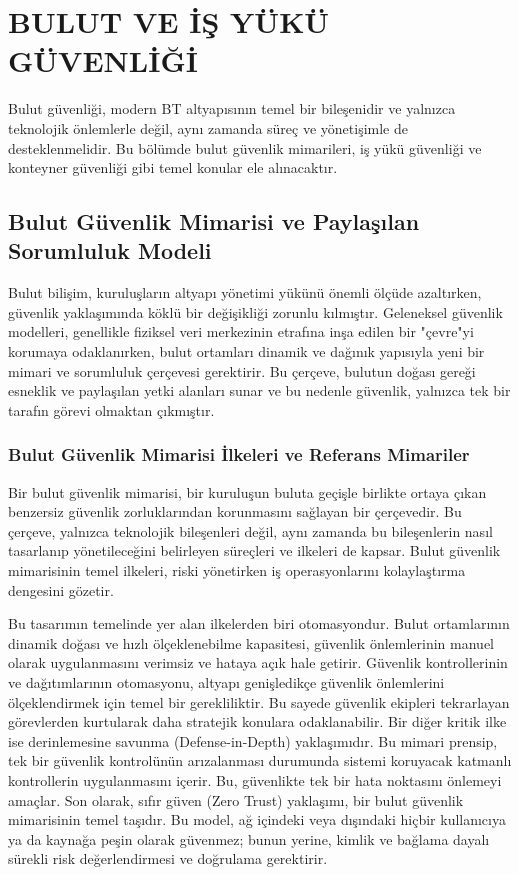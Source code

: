 \chapter{BULUT VE İŞ YÜKÜ GÜVENLİĞİ}

Bulut güvenliği, modern BT altyapısının temel bir bileşenidir ve yalnızca teknolojik önlemlerle değil, aynı zamanda süreç ve yönetişimle de desteklenmelidir. Bu bölümde bulut güvenlik mimarileri, iş yükü güvenliği ve konteyner güvenliği gibi temel konular ele alınacaktır.

\section{Bulut Güvenlik Mimarisi ve Paylaşılan Sorumluluk Modeli}

Bulut bilişim, kuruluşların altyapı yönetimi yükünü önemli ölçüde azaltırken, güvenlik yaklaşımında köklü bir değişikliği zorunlu kılmıştır. Geleneksel güvenlik modelleri, genellikle fiziksel veri merkezinin etrafına inşa edilen bir "çevre"yi korumaya odaklanırken, bulut ortamları dinamik ve dağınık yapısıyla yeni bir mimari ve sorumluluk çerçevesi gerektirir. Bu çerçeve, bulutun doğası gereği esneklik ve paylaşılan yetki alanları sunar ve bu nedenle güvenlik, yalnızca tek bir tarafın görevi olmaktan çıkmıştır.

\subsection{Bulut Güvenlik Mimarisi İlkeleri ve Referans Mimariler}

Bir bulut güvenlik mimarisi, bir kuruluşun buluta geçişle birlikte ortaya çıkan benzersiz güvenlik zorluklarından korunmasını sağlayan bir çerçevedir. Bu çerçeve, yalnızca teknolojik bileşenleri değil, aynı zamanda bu bileşenlerin nasıl tasarlanıp yönetileceğini belirleyen süreçleri ve ilkeleri de kapsar. Bulut güvenlik mimarisinin temel ilkeleri, riski yönetirken iş operasyonlarını kolaylaştırma dengesini gözetir.

Bu tasarımın temelinde yer alan ilkelerden biri otomasyondur. Bulut ortamlarının dinamik doğası ve hızlı ölçeklenebilme kapasitesi, güvenlik önlemlerinin manuel olarak uygulanmasını verimsiz ve hataya açık hale getirir. Güvenlik kontrollerinin ve dağıtımlarının otomasyonu, altyapı genişledikçe güvenlik önlemlerini ölçeklendirmek için temel bir gerekliliktir. Bu sayede güvenlik ekipleri tekrarlayan görevlerden kurtularak daha stratejik konulara odaklanabilir. Bir diğer kritik ilke ise derinlemesine savunma (Defense-in-Depth) yaklaşımıdır. Bu mimari prensip, tek bir güvenlik kontrolünün arızalanması durumunda sistemi koruyacak katmanlı kontrollerin uygulanmasını içerir. Bu, güvenlikte tek bir hata noktasını önlemeyi amaçlar. Son olarak, sıfır güven (Zero Trust) yaklaşımı, bir bulut güvenlik mimarisinin temel taşıdır. Bu model, ağ içindeki veya dışındaki hiçbir kullanıcıya ya da kaynağa peşin olarak güvenmez; bunun yerine, kimlik ve bağlama dayalı sürekli risk değerlendirmesi ve doğrulama gerektirir.

